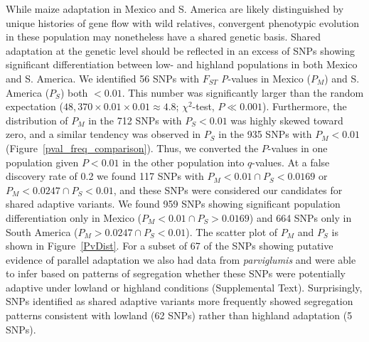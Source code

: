{{%

While maize adaptation in Mexico and S. America are likely distinguished by unique histories of gene flow with wild relatives, convergent phenotypic evolution in these population may nonetheless have a shared genetic basis.   
Shared adaptation at the genetic level should be reflected in an excess of SNPs showing significant differentiation between low- and highland populations in both Mexico and S. America. 
We identified 56 SNPs with $F_{ST}$ \emph{P}-values in Mexico ($P_M$) and S. America ($P_S$) both $<0.01$.   
This number was significantly larger than the random expectation ($48,370\times 0.01 \times 0.01 \approx 4.8$; $\chi^2$-test, $P\ll0.001$).  
Furthermore, the distribution of $P_M$ in the 712 SNPs with $P_S<0.01$ was highly skewed toward zero, and a similar tendency was observed in $P_S$ in the 935 SNPs with $P_M<0.01$ (Figure~\ref{pval_freq_comparison}).  
Thus, we converted the $P$-values in one population given $P<0.01$ in the other population into $q$-values.  
At a false discovery rate of 0.2 we found 117 SNPs with $P_M<0.01 \cap P_S < 0.0169$ or $P_M<0.0247 \cap P_S < 0.01$, and these SNPs were considered our candidates for shared adaptive variants.
We found 959 SNPs showing significant population differentiation only in Mexico ($P_M<0.01 \cap P_S > 0.0169$) and 664 SNPs only in South America  ($P_M>0.0247 \cap P_S < 0.01$).  
The scatter plot of $P_M$ and $P_S$ is shown in Figure~\ref{PvDist}.  
For a subset of 67 of the SNPs showing putative evidence of parallel adaptation we also had data from \textit{parviglumis} and were able to infer based on patterns of segregation whether these SNPs were potentially adaptive under lowland or highland conditions (Supplemental Text).  
Surprisingly, SNPs identified as shared adaptive variants more frequently showed segregation patterns consistent with lowland  (62 SNPs) rather than highland adaptation (5 SNPs). 


}}
